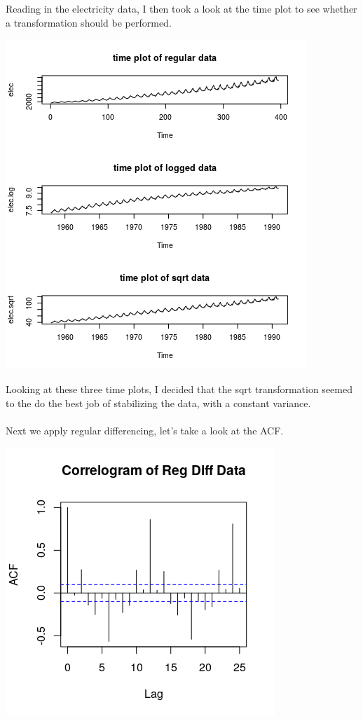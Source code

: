 \documentclass[11pt]{article}
\begin{document}
\newpage
\section{}
Reading in the electricity data, I then took a look at the time plot to see whether a transformation should be performed.
\begin{center}
\includegraphics[scale=1.2]{4A}
\end{center}
Looking at these three time plots, I decided that the sqrt transformation seemed to the do the best job of stabilizing the data, with a constant variance.
\\\\
Next we apply regular differencing, let's take a look at the ACF.\\
\begin{center}
\includegraphics[scale=1]{4B}
\end{center}
\end{document}

